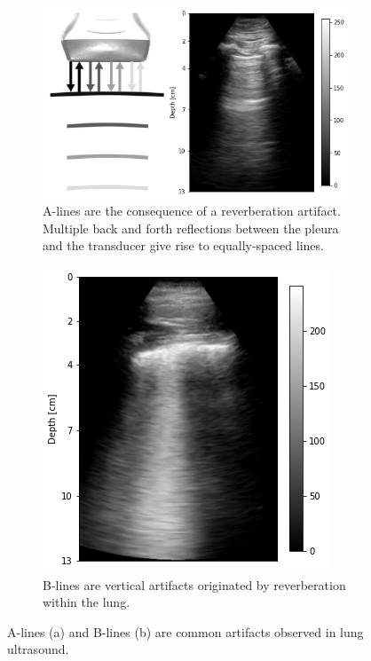 \documentclass[12pt]{article} %
\begin{document}
	\begin{figure}[h]
	\centering
		\begin{subfigure}[b]{0.55\textwidth}
		\centering
		\includegraphics[width=\textwidth]{figuras/alines_plus.png}
		\caption{\footnotesize A-lines are the consequence of a reverberation artifact. Multiple back and forth reflections between the pleura and the transducer give rise to equally-spaced lines.}
		\end{subfigure}
		\centering
		\hspace{2em}
		\begin{subfigure}[b]{0.32\textwidth}
		\centering
		\includegraphics[width=\textwidth]{figuras/blines.png}
		\caption{\footnotesize B-lines are vertical artifacts originated by reverberation within the lung.}
		\end{subfigure}	
	\caption{\small A-lines (a) and B-lines (b) are common artifacts observed in lung ultrasound.}
	\label{artifacts}
	\end{figure}	
\end{document}
